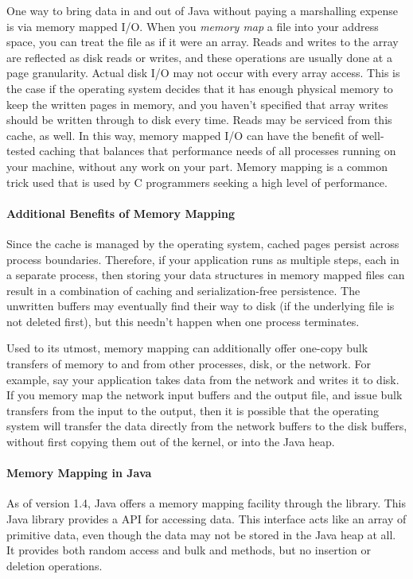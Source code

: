 One way to bring data in and out of Java without paying a marshalling expense is
via memory mapped I/O. When you \emph{memory map} a file into your address
space, you can treat the file as if it were an array. Reads and writes to the
array are reflected as disk reads or writes, and these operations are usually
done at a page granularity. Actual disk I/O may not occur with every array
access. This is the case if the operating system decides that it has enough
physical memory to keep the written pages in memory, and you haven't specified
that array writes should be written through to disk every time. Reads may be
serviced from this cache, as well. In this way, memory mapped I/O can have the
benefit of well-tested caching that balances that performance needs of all
processes running on your machine, without any work on your part.  Memory
mapping is a common trick used that is used by C programmers seeking a high
level of performance.

\paragraph{Additional Benefits of Memory Mapping}
Since the cache is managed by the operating system, cached pages persist across
process boundaries. Therefore, if your application runs as multiple steps, each
in a separate process, then storing your data structures in memory mapped files
can result in a combination of caching and serialization-free persistence. The
unwritten buffers may eventually find their way to disk (if the underlying file
is not deleted first), but this needn't happen when one process terminates.

Used to its utmost, memory mapping can additionally offer one-copy bulk
transfers of memory to and from other processes, disk, or the network. For
example, say your application takes data from the network and writes it to
disk. If you memory map the network input buffers and the output file, and issue
bulk transfers from the input to the output, then it is possible that the
operating system will transfer the data directly from the network buffers to the
disk buffers, without first copying them out of the kernel, or into the
Java heap.

\paragraph{Memory Mapping in Java}
As of version 1.4, Java offers a memory mapping facility through the
 library. This Java library provides a  API for
accessing data. This interface acts like an array of primitive data, even though
the data may not be stored in the Java heap at all. It provides both random
access and bulk  and  methods, but no insertion or deletion
operations.

